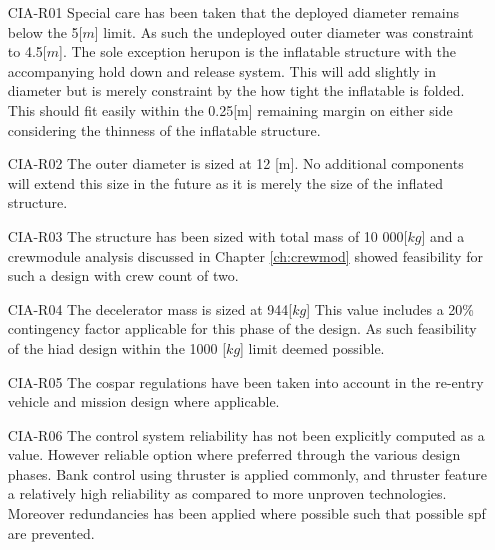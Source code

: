 \begin{itemize}
\item[CIA-R01] Special care has been taken that the deployed diameter remains below the 5[$m$] limit. As such the undeployed outer diameter was constraint to 4.5[$m$]. The sole exception herupon is the inflatable structure with the accompanying hold down and release system. This will add slightly in diameter but is merely constraint by the how tight the inflatable is folded. This should fit easily within the 0.25[m] remaining margin on either side considering the thinness of the inflatable structure. 
\item[CIA-R02] The outer diameter is sized at 12 [m]. No additional components will extend this size in the future as it is merely the size of the inflated structure.
\item[CIA-R03] The structure has been sized with total mass of 10 000[$kg$] and a crewmodule analysis discussed in Chapter \ref{ch:crewmod} showed feasibility for such a design with crew count of two.
\item[CIA-R04] The decelerator mass is sized at 944[$kg$] This value includes a 20\% contingency factor applicable for this phase of the design. As such feasibility of the \gls{hiad} design within the 1000 [$kg$] limit deemed possible.
\item[CIA-R05] The \gls{cospar} regulations have been taken into account in the re-entry vehicle and mission design where applicable.
\item[CIA-R06] The control system reliability has not been explicitly computed as a value. However reliable option where preferred through the various design phases. Bank control using thruster is applied commonly, and thruster feature a relatively high reliability as compared to more unproven technologies. Moreover redundancies has been applied where possible such that possible \gls{spf} are prevented. 
\end{itemize}


